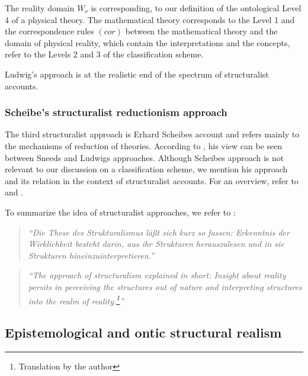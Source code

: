\documentclass{article}
\begin{document}
The reality domain $W_\nu$ is corresponding, to our definition of the ontological Level 4 of a physical theory. The mathematical theory corresponds to the Level 1 and the correspondence rules $(cor)$ between the mathematical theory and the domain of physical reality, which contain the interpretations and the concepts, refer to the Levels 2 and 3 of the classification scheme. \newline

Ludwig's approach is at the realistic end of the spectrum of structuralist accounts. 

\newpage

\subsubsection{Scheibe's structuralist reductionism approach}

The third structuralist approach is Erhard Scheibe\textsc{}s account and refers mainly to the mechanisms of reduction of theories. According to \cite[]{sep-physics-structuralism}, his view can be seen between Sneed\textsc{}s and Ludwig\textsc{}s approaches. Although Scheibe\textsc{}s approach is not relevant to our discussion on a classification scheme, we mention his approach and its relation in the context of structuralist accounts. For an overview, refer to \cite[]{scheibe2001between} and \cite[]{scheibe2013reduktion}. \newline

To summarize the idea of structuralist approaches, we refer to \cite[p.399]{balzer1980gunther}:

\begin{quote}
\textit{``Die These des Strukturalismus l\"a\ss t sich kurz so fassen: Erkenntnis der Wirklichkeit besteht darin, aus ihr Strukturen herauszulesen und in sie Strukturen
hineinzuinterpretieren.''}
\end{quote}

\begin{quote}
\textit{``The approach of structuralism explained in short: Insight about reality persits in perceiving the structures out of nature and interpreting structures into the realm of reality.\footnote{Translation by the author}''}
\end{quote}



\subsection{Epistemological and ontic structural realism}
\end{document}
